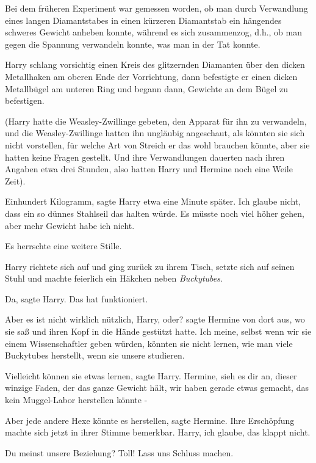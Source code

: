 Bei dem früheren Experiment war gemessen worden, ob man durch Verwandlung eines
langen Diamantstabes in einen kürzeren Diamantstab ein hängendes schweres
Gewicht anheben konnte, während es sich zusammenzog, d.h., ob man gegen die
Spannung verwandeln konnte, was man in der Tat konnte.

Harry schlang vorsichtig einen Kreis des glitzernden Diamanten über den dicken
Metallhaken am oberen Ende der Vorrichtung, dann befestigte er einen dicken
Metallbügel am unteren Ring und begann dann, Gewichte an dem Bügel zu
befestigen.

(Harry hatte die Weasley-Zwillinge gebeten, den Apparat für ihn zu verwandeln,
und die Weasley-Zwillinge hatten ihn ungläubig angeschaut, als könnten sie sich
nicht vorstellen, für welche Art von Streich er das wohl brauchen könnte, aber
sie hatten keine Fragen gestellt. Und ihre Verwandlungen dauerten nach ihren
Angaben etwa drei Stunden, also hatten Harry und Hermine noch eine Weile Zeit).

\glqq{}Einhundert Kilogramm\grqq{}, sagte Harry etwa eine Minute später. \glqq{}
Ich glaube nicht, dass ein so dünnes Stahlseil das halten würde. Es müsste noch
viel höher gehen, aber mehr Gewicht habe ich nicht.\grqq{}

Es herrschte eine weitere Stille.

Harry richtete sich auf und ging zurück zu ihrem Tisch, setzte sich auf seinen
Stuhl und machte feierlich ein Häkchen neben \glqq{}\emph{Buckytubes}\grqq{}.

\glqq{}Da\grqq{}, sagte Harry. \glqq{}Das hat funktioniert.\grqq{}

\glqq{}Aber es ist nicht wirklich nützlich, Harry, oder?\grqq{} sagte Hermine von
dort aus, wo sie saß und ihren Kopf in die Hände gestützt hatte. \glqq{}Ich
meine, selbst wenn wir sie einem Wissenschaftler geben würden, könnten sie nicht
lernen, wie man viele Buckytubes herstellt, wenn sie unsere studieren.\grqq{}

\glqq{}Vielleicht können sie etwas lernen\grqq{}, sagte Harry. \glqq{}Hermine,
sieh es dir an, dieser winzige Faden, der das ganze Gewicht hält, wir haben
gerade etwas gemacht, das kein Muggel-Labor herstellen könnte -\grqq{}

\glqq{}Aber jede andere Hexe könnte es herstellen\grqq{}, sagte Hermine. Ihre
Erschöpfung machte sich jetzt in ihrer Stimme bemerkbar. \glqq{}Harry, ich
glaube, das klappt nicht.\grqq{}

\glqq{}Du meinst unsere Beziehung? Toll! Lass uns Schluss machen.\grqq{}

